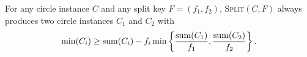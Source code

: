 \documentclass[a4paper,style=print,bibliography=totoc,nexus,lnum,extramargin]{tubsbook}
\begin{document}
\begin{lemma}\label{th:min1}

    For any circle instance $C$ and any split key $F = (f_1, f_2)$, \textsc{Split}$(C,F)$ always produces two circle instances $C_1$ and $C_2$ with
    $$\min(C_i) \ge \operatorname{sum}(C_i) - f_i\min\left\{\frac{\operatorname{sum}(C_1)}{f_1},\frac{\operatorname{sum}(C_2)}{f_2}\right\}.$$


\end{lemma}
\end{document}
